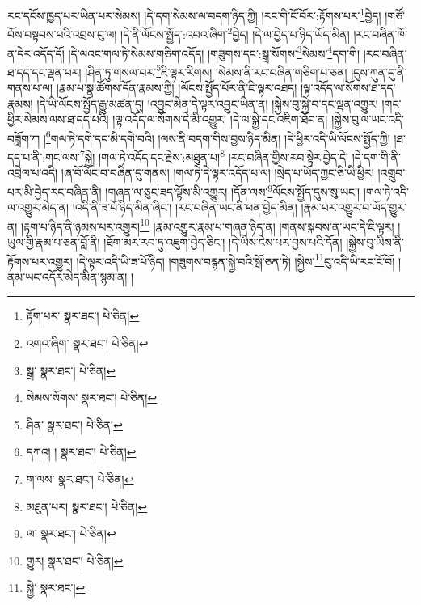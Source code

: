 རང་དངོས་ཁྱད་པར་ཡིན་པར་སེམས། །དེ་དག་སེམས་ལ་བདག་ཉིད་ཀྱི། །རང་གི་ངོ་བོར་:རྟོགས་པར་\footnote{རྟོག་པར་  སྣར་ཐང་།  པེ་ཅིན། }བྱེད། །གཙོ་བོས་བསྟབས་པའི་འབྲས་བུ་ལ། །དེ་ནི་ལོངས་སྤྱོད་:འབའ་ཞིག་\footnote{འགའ་ཞིག་  སྣར་ཐང་།  པེ་ཅིན། }བྱེད། །དེ་ལ་བྱེད་པ་ཉིད་ཡོད་མིན། །རང་བཞིན་ཁོ་ན་དེར་འདོད་དོ། །དེ་ལའང་གལ་ཏེ་སེམས་གཅིག་འདོད། །གཟུགས་དང་:སྒྲ་སོགས་\footnote{སྒྲ་  སྣར་ཐང་།  པེ་ཅིན། }སེམས་\footnote{སེམས་སོགས་  སྣར་ཐང་།  པེ་ཅིན། }དག་གི། །རང་བཞིན་ཐ་དད་དང་ལྡན་པར། །ཤིན་ཏུ་གསལ་བར་\footnote{ཤིན་  སྣར་ཐང་།  པེ་ཅིན། }ཇི་ལྟར་རིགས། །སེམས་ནི་རང་བཞིན་གཅིག་པ་ཅན། །དུས་ཀུན་དུ་ནི་གནས་པ་ལ། །རྣམ་པ་སྣ་ཚོགས་དོན་རྣམས་ཀྱི། །ལོངས་སྤྱོད་པོར་ནི་ཇི་ལྟར་འཐད། །ལྟ་འདོད་ལ་སོགས་ཐ་དད་རྣམས། །དེ་ཡི་ལོངས་སྤྱོད་རྒྱུ་མཚན་དུ། །འབྱུང་མིན་དེ་ལྟར་འབྱུང་ཡིན་ན། །སྐྱེས་བུ་སྐྱེ་བ་དང་ལྡན་འགྱུར། །གང་ཕྱིར་སེམས་ལས་ཐ་དད་པའི། །ལྟ་འདོད་ལ་སོགས་དེ་མི་འགྱུར། །དེ་ལ་སྐྱེ་དང་འཇིག་ཐོབ་ན། །སྐྱེས་བུ་ལ་ཡང་འདི་བཟློག་ཀ །\footnote{དཀའ། །  སྣར་ཐང་།  པེ་ཅིན། }གལ་ཏེ་དགེ་དང་མི་དགེ་བའི། །ལས་ནི་བདག་གིས་བྱས་ཉིད་མིན། །དེ་ཕྱིར་འདི་ཡི་ལོངས་སྤྱོད་ཀྱི། །ཐ་དད་པ་ནི་:གང་ལས་\footnote{ག་ལས་  སྣར་ཐང་།  པེ་ཅིན། }སྐྱེ། །གལ་ཏེ་འདོད་དང་རྗེས་:མཐུན་པ།\footnote{མཐུན་པར།  སྣར་ཐང་།  པེ་ཅིན། } །རང་བཞིན་གྱིས་རབ་སྟེར་བྱེད་དེ། །དེ་དག་གི་ནི་འབྲེལ་པ་འདི། །ཞ་བོ་ལོང་བ་བཞིན་དུ་གནས། །གལ་ཏེ་དེ་ལྟར་འདོད་པ་ལ། །སྲེད་པ་ཡོད་ཀྱང་ཅི་ཡི་ཕྱིར། །འགྲུབ་པར་མི་བྱེད་རང་བཞིན་ནི། །གཞན་ལ་ཅུང་ཟད་ལྟོས་མི་འགྱུར། །དོན་ལས་\footnote{ལ་  སྣར་ཐང་།  པེ་ཅིན། }ལོངས་སྤྱོད་དུས་སུ་ཡང་། །གལ་ཏེ་འདི་ལ་འགྱུར་མེད་ན། །འདི་ནི་ཟ་པོ་ཉིད་མིན་ཞིང་། །རང་བཞིན་ཡང་ནི་ཕན་བྱེད་མིན། །རྣམ་པར་འགྱུར་བ་ཡོད་གྱུར་ན། །རྟག་པ་ཉིད་ནི་ཉམས་པར་འགྱུར།\footnote{གྱུར།  སྣར་ཐང་།  པེ་ཅིན། } །རྣམ་འགྱུར་རྣམ་པ་གཞན་ཉིད་ན། །གནས་སྐབས་ན་ཡང་དེ་ཇི་ལྟར། །ཡུལ་གྱི་རྣམ་པ་ཅན་བློ་ནི། །ཐོག་མར་རབ་ཏུ་འཇུག་བྱེད་ཅིང་། །དེ་ཡིས་ངེས་པར་བྱས་པའི་དོན། །སྐྱེས་བུ་ཡིས་ནི་རྟོགས་པར་འགྱུར། །དེ་ལྟར་འདི་ཡི་ཟ་པོ་ཉིད། །གཟུགས་བརྙན་སྐྱེ་བའི་སྒོ་ཅན་ཏེ། །སྐྱེས་\footnote{སྐྱེ་  སྣར་ཐང་། }བུ་འདི་ཡི་རང་ངོ་བོ། །ནམ་ཡང་འདོར་མེད་མིན་སྙམ་ན། །
